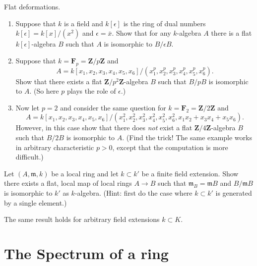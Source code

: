 \begin{exercise}
\label{exercise-flat-deformations}
Flat deformations.
\begin{enumerate}
\item Suppose that $k$ is a field and $k[\epsilon]$ is the ring of
dual numbers $k[\epsilon] = k[x]/(x^2)$ and $\epsilon = \bar x$. Show that for
any $k$-algebra $A$ there is a flat $k[\epsilon]$-algebra $B$ such that
$A$ is isomorphic to $B/\epsilon B$.
\item Suppose that $k = {\mathbf F}_p = {\mathbf Z}/p{\mathbf Z}$ and
$$
A = k[x_1, x_2, x_3, x_4, x_5, x_6]/
(x_1^p, x_2^p, x_3^p, x_4^p, x_5^p, x_6^p).
$$
Show that there exists a flat ${\mathbf Z}/p^2{\mathbf Z}$-algebra $B$ such
that $B/pB$ is isomorphic to $A$. (So here $p$ plays the role of $\epsilon$.)
\item Now let $p = 2$ and consider the same question for
$k = {\mathbf F}_2 = {\mathbf Z}/2{\mathbf Z}$ and
$$
A = k[x_1, x_2, x_3, x_4, x_5, x_6]/
(x_1^2, x_2^2, x_3^2, x_4^2, x_5^2, x_6^2, x_1x_2 + x_3x_4 + x_5x_6).
$$
However, in this case show that there does {\it not} exist a flat
${\mathbf Z}/4{\mathbf Z}$-algebra $B$ such that $B/2B$ is isomorphic to
$A$. (Find the trick! The same example works in arbitrary characteristic
$p>0$, except that the computation is more difficult.)
\end{enumerate}
\end{exercise}

\begin{exercise}
\label{exercise-flat-given-residue-field-extension}
Let $(A, {\mathfrak m}, k)$ be a local ring and let $k \subset k'$ be
a finite field extension. Show there exists a flat, local map of
local rings $A \to B$ such that ${\mathfrak m}_B = {\mathfrak m} B$ and
$B/{\mathfrak m} B$ is
isomorphic to $k'$ as $k$-algebra. (Hint: first do the case where
$k \subset k'$ is generated by a single element.)
\end{exercise}

\begin{remark}
\label{remark-flat-given-residue-field-extension-general}
The same result holds for arbitrary field extensions $k \subset K$.
\end{remark}










\section{The Spectrum of a ring}
\label{section-spectrum-ring}

